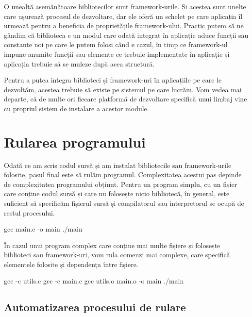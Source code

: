 O unealtă asemănătoare bibliotecilor sunt framework-urile. Și acestea sunt
unelte care ușurează procesul de dezvoltare, dar ele oferă un schelet pe care
aplicația îl urmează pentru a beneficia de proprietățile framework-ului. Practic
putem să ne gândim că biblioteca e un modul care odată integrat în aplicație
aduce funcții sau constante noi pe care le putem folosi când e cazul, în timp ce
framework-ul impune anumite funcții sau elemente ce trebuie implementate în
aplicație și aplicația trebuie să se muleze după acea structură.

Pentru a putea integra biblioteci și framework-uri în aplicațiile pe care le
dezvoltăm, acestea trebuie să existe pe sistemul pe care lucrăm. Vom vedea mai
departe, că de multe ori fiecare platformă de dezvoltare specifică unui limbaj
vine cu propriul sistem de instalare a acestor module.

\section{Rularea programului}
\label{sec:appdev-run}

Odată ce am scris codul sursă și am instalat bibliotecile sau framework-urile
folosite, pasul final este să rulăm programul. Complexitatea acestui pas depinde
de complexitatea programului obținut. Pentru un program simplu, cu un fișier
care conține codul sursă și care nu folosește nicio bibliotecă, în general, este
suficient să specificăm fișierul sursă și compilatorul sau interpretorul se
ocupă de restul procesului.


\begin{screen}
gcc main.c -o main
./main
\end{screen}

În cazul unui program complex care conține mai multe fișiere și folosește
biblioteci sau framework-uri, vom rula comenzi mai complexe, care specifică
elementele folosite și dependența între fișiere.


\begin{screen}
gcc -c utils.c
gcc -c main.c
gcc utils.o main.o -o main
./main
\end{screen}

\subsection{Automatizarea procesului de rulare}
\label{sec:appdev-automation}

